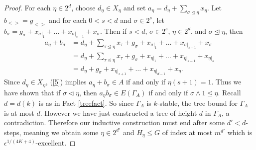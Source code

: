 \documentclass[11pt]{article}
\theoremstyle{definition}
\begin{document}
\begin{proof}
For each $\eta \in 2^d$, choose $d_{\eta}\in X_{\eta}$ and set $a_{\eta}=d_{\eta}+\sum_{\sigma\trianglelefteq \eta}x_{\eta}$.  Let $b_{<>}=g_{<>}$ and for each $0<s<d$ and $\sigma \in 2^{s}$, let $b_{\sigma}= g_{\sigma}+x_{\sigma|_{1}}+\ldots +x_{\sigma|_{s-1}}+x_{\sigma}$.  Then if $s<d$, $\sigma\in 2^s$, $\eta\in 2^d$, and $\sigma \trianglelefteq \eta$, then
\begin{align*}
a_{\eta}+b_{\sigma}&=d_{\eta}+\sum_{\tau\trianglelefteq \eta}x_{\tau}+g_{\sigma}+x_{\sigma|_{1}}+\ldots +x_{\sigma|_{s-1}}+x_{\sigma}\\
&=d_{\eta}+\sum_{\tau\trianglelefteq \eta}x_{\tau}+g_{\sigma}+x_{\eta|_{1}}+\ldots +x_{\eta|_{s-1}}+x_{\eta|_s}\\
&=d_{\eta}+g_{\sigma}+x_{\eta|_{s+1}}+\ldots +x_{\eta|_{d-1}}+x_{\eta}.
\end{align*}
Since $d_{\eta}\in X_{\eta}$, (\ref{5}) implies $a_{\eta}+b_{\sigma}\in A$ if and only if $\eta(s+1)=1$.  Thus we have shown that if $\sigma \triangleleft \eta$, then $a_{\eta}b_{\sigma}\in E(\Gamma_A)$ if and only if $\sigma \wedge 1\trianglelefteq \eta$.  Recall $d=d(k)$ is as in Fact \ref{treefact}.  So since $\Gamma_A$ is $k$-stable, the tree bound for $\Gamma_A$ is at most $d$.  However we have just constructed a tree of height $d$ in $\Gamma_A$, a contradiction.  Therefore our inductive construction must end after some $d'<d$-steps, meaning we obtain some $\eta \in 2^{d'}$ and $H_{\eta}\leq G$ of index at most $m^{d'}$ which is $\epsilon^{1/(4K+4)}$-excellent.
\end{proof}
\end{document}
